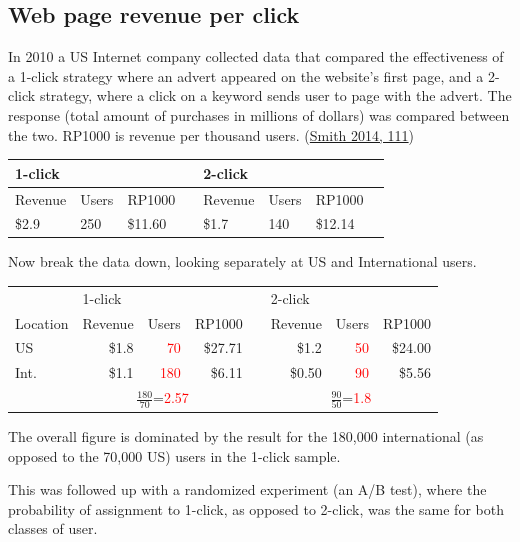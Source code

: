 \documentclass[
  10pt,
  b5paper]{book}
\begin{document}
\hypertarget{web-page-revenue-per-click}{%
\subsection*{Web page revenue per click}\label{web-page-revenue-per-click}}

In 2010 a US Internet company collected data that compared the effectiveness
of a 1-click strategy where an advert appeared on the website's first page,
and a 2-click strategy, where a click on a keyword sends user to page with
the advert. The response (total amount of purchases in millions of dollars)
was compared between the two. RP1000 is revenue per thousand users.
(\protect\hyperlink{ref-smith-sd}{Smith 2014, 111})

\begin{longtable}[]{@{}llllllll@{}}
\toprule
1-click & & & & 2-click & & & \\
\midrule
\endhead
Revenue & Users & RP1000 & & Revenue & Users & RP1000 & \\
\$2.9 & 250 & \$11.60 & & \$1.7 & 140 & \$12.14 & \\
\bottomrule
\end{longtable}

Now break the data down, looking separately at US and International users.

\begin{tabular}{l r r r r r r r}
& \multicolumn{3}{l}{1-click} & & \multicolumn{3}{l}{2-click}\\
Location   & Revenue & Users   & RP1000 && Revenue & Users & RP1000\\
US & \$1.8   & \textcolor{red}{70}  &\$27.71 && \$1.2 & \textcolor{red}{50}  & \$24.00\\
Int. & \$1.1   & \textcolor{red}{180} &\$6.11  && \$0.50 & \textcolor{red}{90} & \$5.56\\
& \multicolumn{3}{c}{$\frac{180}{70}$=\textcolor{red}{2.57}} & & \multicolumn{3}{c}{$\frac{90}{50}$=\textcolor{red}{1.8}}\\
\end{tabular}

The overall figure is dominated by the result for the 180,000 international
(as opposed to the 70,000 US) users in the 1-click sample.

This was followed up with a randomized experiment (an A/B test), where
the probability of assignment to 1-click, as opposed to 2-click, was
the same for both classes of user.
\end{document}
